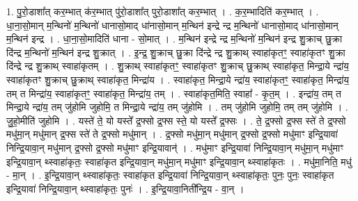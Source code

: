 \documentclass[17pt]{extarticle}
\begin{document}
1. पु॒रो॒डाशा᳚त् कर॒म्भात् क॑र॒म्भात् पु॑रो॒डाशा᳚त् पुरो॒डाशा᳚त् कर॒म्भात् । . क॒र॒म्भादिति॑ कर॒म्भात् । . धा॒ना॒सो॒मान् म॒न्थिनो॑ म॒न्थिनो॑ धानासो॒माद् धा॑नासो॒मान् म॒न्थिन॑ इन्द्रे न्द्र म॒न्थिनो॑ धानासो॒माद् धा॑नासो॒मान् म॒न्थिन॑ इन्द्र । . धा॒ना॒सो॒मादिति॑ धाना - सो॒मात् । . म॒न्थिन॑ इन्द्रे न्द्र म॒न्थिनो॑ म॒न्थिन॑ इन्द्र शु॒क्राच् छु॒क्रा दि॑न्द्र म॒न्थिनो॑ म॒न्थिन॑ इन्द्र शु॒क्रात् । . इ॒न्द्र॒ शु॒क्राच् छु॒क्रा दि॑न्द्रे न्द्र शु॒क्राथ् स्वाहा॑कृतꣳ॒॒ स्वाहा॑कृतꣳ शु॒क्रा दि॑न्द्रे न्द्र शु॒क्राथ् स्वाहा॑कृतम् । . शु॒क्राथ् स्वाहा॑कृतꣳ॒॒ स्वाहा॑कृतꣳ शु॒क्राच् छु॒क्राथ् स्वाहा॑कृत॒ मिन्द्रा॒ये न्द्रा॑य॒ स्वाहा॑कृतꣳ शु॒क्राच् छु॒क्राथ् स्वाहा॑कृत॒ मिन्द्रा॑य । . स्वाहा॑कृत॒ मिन्द्रा॒ये न्द्रा॑य॒ स्वाहा॑कृतꣳ॒॒ स्वाहा॑कृत॒ मिन्द्रा॑य॒ तम् त मिन्द्रा॑य॒ स्वाहा॑कृतꣳ॒॒ स्वाहा॑कृत॒ मिन्द्रा॑य॒ तम् । . स्वाहा॑कृत॒मिति॒ स्वाहा᳚ - कृ॒त॒म् । . इन्द्रा॑य॒ तम् त मिन्द्रा॒ये न्द्रा॑य॒ तम् जु॑होमि जुहोमि॒ त मिन्द्रा॒ये न्द्रा॑य॒ तम् जु॑होमि । . तम् जु॑होमि जुहोमि॒ तम् तम् जु॑होमि । . जु॒हो॒मीति॑ जुहोमि । . यस्ते॑ ते॒ यो यस्ते᳚ द्र॒फ्सो द्र॒फ्स स्ते॒ यो यस्ते᳚ द्र॒फ्सः । . ते॒ द्र॒फ्सो द्र॒फ्स स्ते॑ ते द्र॒फ्सो मधु॑मा॒न् मधु॑मान् द्र॒फ्स स्ते॑ ते द्र॒फ्सो मधु॑मान् । . द्र॒फ्सो मधु॑मा॒न् मधु॑मान् द्र॒फ्सो द्र॒फ्सो मधु॑माꣳ इन्द्रि॒यावा॑ निन्द्रि॒यावा॒न् मधु॑मान् द्र॒फ्सो द्र॒फ्सो मधु॑माꣳ इन्द्रि॒यावान्॑ । . मधु॑माꣳ इन्द्रि॒यावा॑ निन्द्रि॒यावा॒न् मधु॑मा॒न् मधु॑माꣳ इन्द्रि॒यावा॒न् थ्स्वाहा॑कृतः॒ स्वाहा॑कृत इन्द्रि॒यावा॒न् मधु॑मा॒न् मधु॑माꣳ इन्द्रि॒यावा॒न् थ्स्वाहा॑कृतः । . मधु॑मा॒निति॒ मधु॑ - मा॒न् । . इ॒न्द्रि॒यावा॒न् थ्स्वाहा॑कृतः॒ स्वाहा॑कृत इन्द्रि॒यावा॑ निन्द्रि॒यावा॒न् थ्स्वाहा॑कृतः॒ पुनः॒ पुनः॒ स्वाहा॑कृत इन्द्रि॒यावा॑ निन्द्रि॒यावा॒न् थ्स्वाहा॑कृतः॒ पुनः॑ । . इ॒न्द्रि॒यावा॒निती᳚न्द्रि॒य - वा॒न् । \newline
\end{document}

